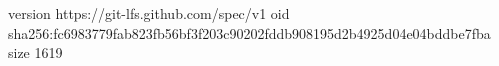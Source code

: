 version https://git-lfs.github.com/spec/v1
oid sha256:fc6983779fab823fb56bf3f203c90202fddb908195d2b4925d04e04bddbe7fba
size 1619
